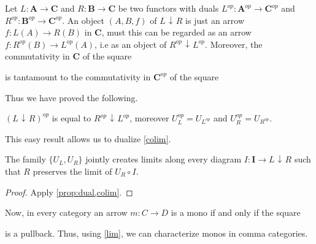 \documentclass[runningheads,envcountsect]{lmcs}
\newcommand{\catname}[1]{\mathbf{#1}}
\newcommand{\id}[1]{\mathsf{id}_{#1}}
\newcommand{\comma}[2]{#1\hspace{1pt} {\downarrow}\hspace{1pt} #2}
\theoremstyle{plain}
\theoremstyle{definition}
\begin{document}
Let $L:\catname{A}\to \catname{C}$ and $R:\catname{B}\to \catname{C}$ be two functors with duals $L^{op}:\catname{A}^{op}\to \catname{C}^{op}$ and $R^{op}:\catname{B}^{op}\to \catname{C}^{op}$.  An object $(A, B, f)$ of $\comma{L}{R}$ is just an arrow $f:L(A)\to R(B)$ in $\catname{C}$, must this can be regarded as an arrow $f:R^{op}(B)\to L^{op}(A)$, i.e as an object of $\comma{R^{op}}{L^{op}}$. Moreover, the commutativity in  $\catname{C}$ of the square
\begin{center}
\end{center} is tantamount to the commutativity in $\catname{C}^{op}$ of the square 
\begin{center}
\end{center} 
	Thus we have proved the following.
\begin{prop}\label{prop:dual}
$(\comma{L}{R})^{op}$ is equal to	$\comma{R^{op}}{L^{op}}$, moreover $U^{op}_L=U_{L^{op}}$ and $U^{op}_R=U_{R^{op}}$.
\end{prop}
This easy result allows us to dualize \cref{colim}.
\begin{cor}\label{lim} The family $\{U_L, U_R\}$ jointly creates limits along
	every diagram $I:\catname{I}\rightarrow \comma{L}{R}$ such that $R$ preserves the limit of $U_R\circ I$.
\end{cor}
\begin{proof}
	Apply \cref{prop:dual,colim}.
\end{proof}

Now, in every category an arrow $m:C\to D$ is a mono if and only if the square
\begin{center}
\end{center} 
is a pullback. Thus, using \cref{lim}, we can characterize monos in comma categories.
\end{document}
